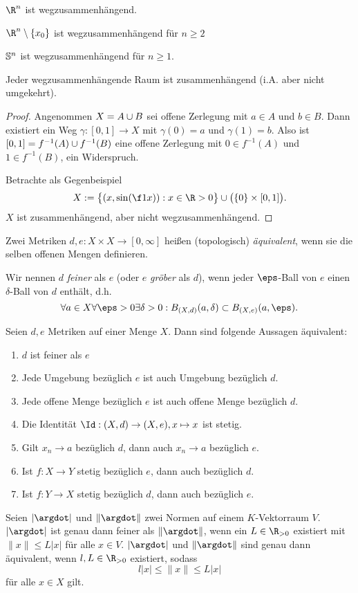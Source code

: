 \begin{ex}
	$\R^n$ ist wegzusammenhängend.

	$\R^n \setminus \{x_0\}$ ist wegzusammenhängend für $n \ge 2$

	$\S^n$ ist wegzusammenhängend für $n \ge 1$.
\end{ex}

\begin{st}
	Jeder wegzusammenhängende Raum ist zusammenhängend (i.A. aber nicht umgekehrt).
	\begin{proof}
		Angenommen $X = A \dunion B$ sei offene Zerlegung mit $a \in A$ und $b \in B$.
		Dann existiert ein Weg $\gamma: [0,1] \to X$ mit $\gamma(0) = a$ und $\gamma(1) = b$.
		Also ist $[0,1] = f^{-1}(A) \dunion f^{-1}(B)$ eine offene Zerlegung mit $0 \in f^{-1}(A)$ und $1 \in f^{-1}(B)$, ein Widerspruch.

		Betrachte als Gegenbeispiel
		\[
			X := \big\{ (x,\sin(\f 1x)) : x \in \R>0 \big\} \cup \big( \{0\} \times [0,1] \big).
		\]
		$X$ ist zusammenhängend, aber nicht wegzusammenhängend.
	\end{proof}
\end{st}

\begin{df}
	Zwei Metriken $d,e : X \times X \to [0, \infty]$ heißen (topologisch) \emph{äquivalent}, wenn sie die selben offenen Mengen definieren.

	Wir nennen $d$ \emph{feiner} als $e$ (oder $e$ \emph{gröber} als $d$), wenn jeder $\eps$-Ball von $e$ einen $\delta$-Ball von $d$ enthält, d.h.
	\[
		\forall a \in X \forall \eps > 0 \exists \delta > 0 : B_{(X,d)}(a, \delta) \subset B_{(X,e)}(a, \eps).
	\]
\end{df}

\begin{prop}
	Seien $d, e$ Metriken auf einer Menge $X$.
	Dann sind folgende Aussagen äquivalent:
	\begin{enumerate}[(1)]
		\item
			$d$ ist feiner als $e$
		\item
			Jede Umgebung bezüglich $e$ ist auch Umgebung bezüglich $d$.
		\item
			Jede offene Menge bezüglich $e$ ist auch offene Menge bezüglich $d$.
		\item
			Die Identität $\Id: (X,d) \to (X,e), x \mapsto x$ ist stetig.
		\item
			Gilt $x_n \to a$ bezüglich $d$, dann auch $x_n \to a$ bezüglich $e$.
		\item
			Ist $f: X \to Y$ stetig bezüglich $e$, dann auch bezüglich $d$.
		\item
			Ist $f: Y \to X$ stetig bezüglich $d$, dann auch bezüglich $e$.
	\end{enumerate}

	Seien $|\argdot|$ und $\|\argdot\|$ zwei Normen auf einem $K$-Vektorraum $V$.
	$|\argdot|$ ist genau dann feiner als $\|\argdot\|$, wenn ein $L \in \R_{>0}$ existiert mit $\|x\| \le L |x|$ für alle $x \in V$.
	$|\argdot|$ und $\|\argdot\|$ sind genau dann äquivalent, wenn $l,L \in \R_{>0}$ existiert, sodass
	\[
		l|x| \le \|x\| \le L|x|
	\]
	für alle $x \in X$ gilt.
\end{prop}

